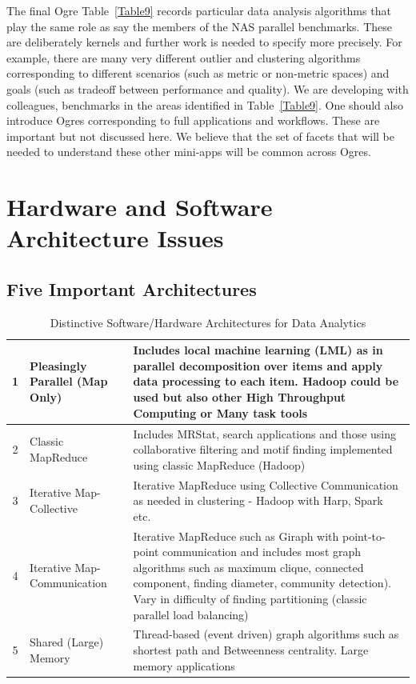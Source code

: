\documentclass{acm_proc_article-sp}
\begin{document}
The final Ogre Table~\ref{Table9} records particular data analysis algorithms that play the same role as say the members of the NAS parallel benchmarks. These are deliberately kernels and further work is needed to specify more precisely. For example, there are many very different outlier and clustering algorithms corresponding to different scenarios (such as metric or non-metric spaces) and goals (such as tradeoff between performance and quality). We are developing with colleagues, benchmarks in the areas identified in Table~\ref{Table9}. One should also introduce Ogres corresponding to full applications and workflows. These are important but not discussed here. We believe that the set of facets that will be needed to understand these other mini-apps will be common across Ogres. 

\section{Hardware and Software Architecture Issues}
\subsection{Five Important Architectures}

\begin{table}[h]
\centering
\caption{Distinctive Software/Hardware Architectures for Data Analytics}
\label{Table10}
\begin{tabular}{|c|p{2cm}|p{5.75cm}|} \hline
1 & Pleasingly Parallel (Map Only) & Includes local machine learning (LML) as in parallel decomposition over items and apply data processing to each item. Hadoop could be used but also other High Throughput Computing or Many task tools \\ \hline
2 & Classic MapReduce & Includes MRStat, search applications and those using collaborative filtering and motif finding implemented using classic MapReduce (Hadoop)\\ \hline
3 & Iterative Map-Collective & Iterative MapReduce using Collective Communication as needed in clustering - Hadoop with Harp, Spark etc. \\ \hline
4 & Iterative Map-Communication & Iterative MapReduce such as Giraph with point-to-point communication and includes most graph algorithms such as maximum clique,  connected component, finding diameter, community detection). Vary in difficulty of finding partitioning (classic parallel load balancing)\\ \hline
5 & Shared (Large) Memory & Thread-based (event driven) graph algorithms such as shortest path and Betweenness centrality. Large memory applications
 
\\ \hline
\end{tabular}
\end{table}
\end{document}
